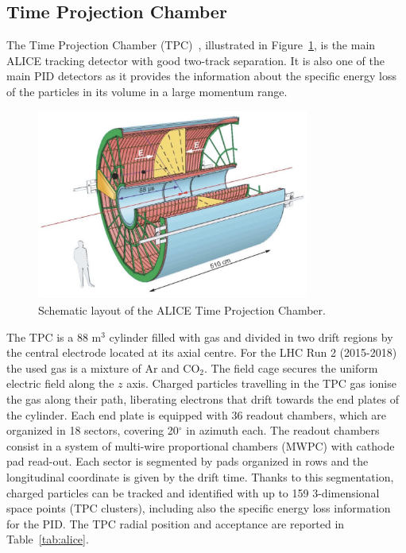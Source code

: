 %
\subsection{Time Projection Chamber} \label{sec:tpc}

The Time Projection Chamber (TPC)~\cite{alice_tpc}, illustrated in Figure~\ref{fig:tpc}, 
is the main ALICE tracking detector with good two-track separation. 
It is also one of the main PID detectors as it provides the information about the specific energy 
loss of the particles in its volume in a large momentum range. 

\begin{figure} [!h]
    \captionsetup{justification=centering}
    \centering
    \includegraphics[width=0.8\textwidth]{gfx/tpc}
	\caption{Schematic layout of the ALICE Time Projection Chamber.}
	\label{fig:tpc}
\end{figure}

The TPC is a 88 m$^3$ cylinder filled with gas and divided in two drift regions by the
central electrode located at its axial centre. 
For the LHC Run 2 (2015-2018) the used gas is a mixture of Ar and CO$_2$.
The field cage secures the uniform electric field along the $z$ axis.
Charged particles travelling in the TPC gas ionise the gas along their path, liberating electrons 
that drift towards the end plates of the cylinder. 
Each end plate is equipped with 36 readout chambers, which are organized in 18 sectors, covering 
20$^{\circ}$ in azimuth each. 
The readout chambers consist in a system of multi-wire proportional chambers (MWPC) with cathode pad
read-out. Each sector is segmented by pads organized in rows and the longitudinal coordinate is given
by the drift time. 
Thanks to this segmentation, charged particles can be tracked and identified with up to 159 
3-dimensional space points (TPC clusters), including also the specific energy loss information
for the PID. The TPC radial position and acceptance are reported in Table~\ref{tab:alice}.

